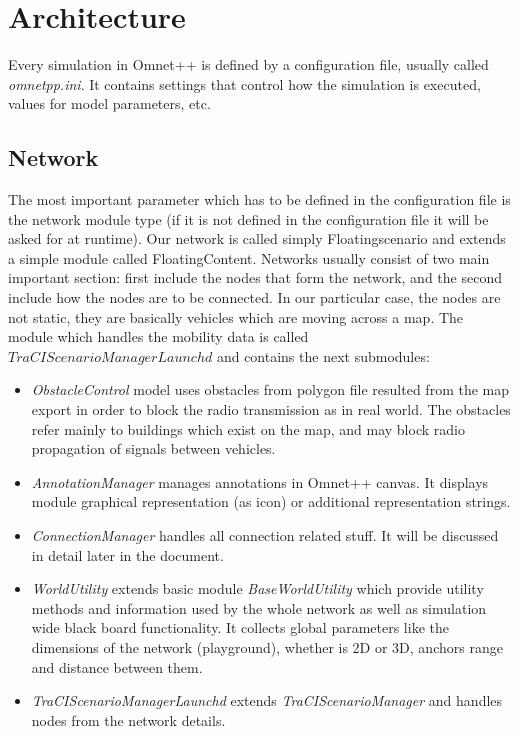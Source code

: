 \section{Architecture}
Every simulation in Omnet++ is defined by a configuration file, usually called
\mbox{\it omnetpp.ini}. It contains settings that control how the simulation is
executed, values for model parameters, etc.

\subsection{Network}
The most important parameter which has to be defined in the configuration file
is the network module type (if it is not defined in the configuration file it
will be asked for at runtime). Our network is called simply Floatingscenario and
extends a simple module called FloatingContent. Networks usually consist
of two main important section: first include the nodes that form the network,
and the second include how the nodes are to be connected. In our particular
case, the nodes are not static, they are basically vehicles which are moving
across a map. The module which handles the mobility data is called
$TraCIScenarioManagerLaunchd$ and contains the next submodules: 

\begin{itemize}
  \item {\it ObstacleControl} model uses obstacles from polygon file resulted
  from the map export in order to block the radio transmission as in real world. The
  obstacles refer mainly to buildings which exist on the map, and may block
  radio propagation of signals between vehicles.
  \item {\it AnnotationManager} manages annotations in Omnet++ canvas. It
  displays module graphical representation (as icon) or additional representation
  strings.
  \item {\it ConnectionManager} handles all connection related stuff. It will be
  discussed in detail later in the document.
  \item {\it WorldUtility} extends basic module {\it BaseWorldUtility} which
  provide utility methods and information used by the whole network as well as
  simulation wide black board functionality. It collects global parameters like
  the dimensions of the network (playground), whether is 2D or 3D, anchors
  range and distance between them.
  \item {\it TraCIScenarioManagerLaunchd} extends {\it TraCIScenarioManager} and
  handles nodes from the network details.
\end{itemize}


